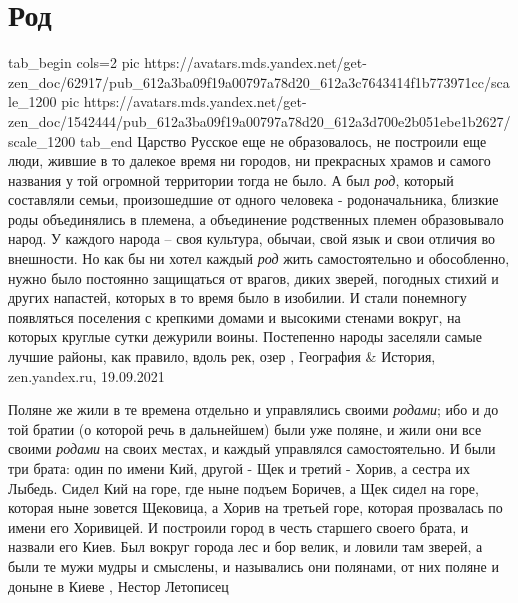  
 
 
 
 
\chapter{Род}

\ifcmt
  tab_begin cols=2
     pic https://avatars.mds.yandex.net/get-zen_doc/62917/pub_612a3ba09f19a00797a78d20_612a3c7643414f1b773971cc/scale_1200
     pic https://avatars.mds.yandex.net/get-zen_doc/1542444/pub_612a3ba09f19a00797a78d20_612a3d700e2b051ebe1b2627/scale_1200
  tab_end
\fi
Царство Русское еще не образовалось, не построили еще люди, жившие в то далекое
время ни городов, ни прекрасных храмов и самого названия у той огромной
территории тогда не было.  А был \emph{род}, который составляли семьи,
произошедшие от одного человека - родоначальника, близкие роды объединялись в
племена, а объединение родственных племен образовывало народ. У каждого народа
– своя культура, обычаи, свой язык и свои отличия во внешности.  Но как бы ни
хотел каждый \emph{род} жить самостоятельно и обособленно, нужно было постоянно
защищаться от врагов, диких зверей, погодных стихий и других напастей, которых
в то время было в изобилии.  И стали понемногу появляться поселения с крепкими
домами и высокими стенами вокруг, на которых круглые сутки дежурили воины.
Постепенно народы заселяли самые лучшие районы, как правило, вдоль рек, озер
, 
География \& История, zen.yandex.ru, 19.09.2021

Поляне же жили в те времена отдельно и управлялись своими \emph{родами}; ибо и
до той братии (о которой речь в дальнейшем) были уже поляне, и жили они все
своими \emph{родами} на своих местах, и каждый управлялся самостоятельно. И
были три брата: один по имени Кий, другой - Щек и третий - Хорив, а сестра их
Лыбедь. Сидел Кий на горе, где ныне подъем Боричев, а Щек сидел на горе,
которая ныне зовется Щековица, а Хорив на третьей горе, которая прозвалась по
имени его Хоривицей. И построили город в честь старшего своего брата, и назвали
его Киев. Был вокруг города лес и бор велик, и ловили там зверей, а были те
мужи мудры и смыслены, и назывались они полянами, от них поляне и доныне в
Киеве
, Нестор Летописец
